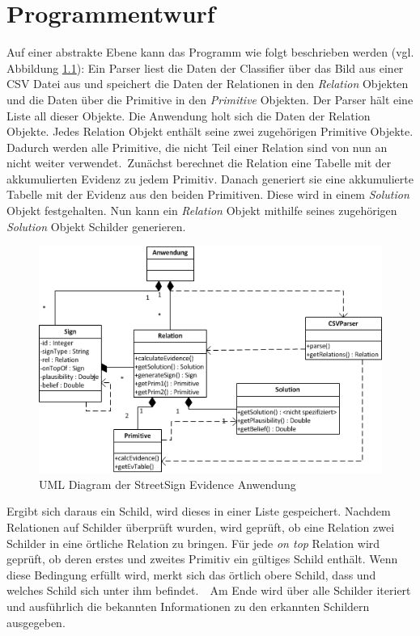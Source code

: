 \chapter{Programmentwurf}
Auf einer abstrakte Ebene kann das Programm wie folgt beschrieben werden (vgl. Abbildung \ref{sse}):
Ein Parser liest die Daten der Classifier über das Bild aus einer CSV Datei aus und speichert die Daten der Relationen in den \textit{Relation} Objekten und die Daten über die Primitive in den \textit{Primitive} Objekten. Der Parser hält eine Liste all dieser Objekte. Die Anwendung holt sich die Daten der Relation Objekte. Jedes Relation Objekt enthält seine zwei zugehörigen Primitive Objekte. Dadurch werden alle Primitive, die nicht Teil einer Relation sind von nun an nicht weiter verwendet.\
Zunächst berechnet die Relation eine Tabelle mit der akkumulierten Evidenz zu jedem Primitiv. Danach generiert sie eine akkumulierte Tabelle mit der Evidenz aus den beiden Primitiven. Diese wird in einem \textit{Solution} Objekt festgehalten. Nun kann ein \textit{Relation} Objekt mithilfe seines zugehörigen \textit{Solution} Objekt Schilder generieren.

\begin{figure}[htbp]
    \centering
    \includegraphics[scale=1]{images/uml.png}
    \caption{UML Diagram der StreetSign Evidence Anwendung}
    \label{sse}
\end{figure}

Ergibt sich daraus ein Schild, wird dieses in einer Liste gespeichert. Nachdem Relationen auf Schilder überprüft wurden, wird geprüft, ob eine Relation zwei Schilder in eine örtliche Relation zu bringen. Für jede \textit{on top} Relation wird geprüft, ob deren erstes und zweites Primitiv ein gültiges Schild enthält. Wenn diese Bedingung erfüllt wird, merkt sich das örtlich obere Schild, dass und welches Schild sich unter ihm befindet.\
\
Am Ende wird über alle Schilder iteriert und ausführlich die bekannten Informationen zu den erkannten Schildern ausgegeben.


